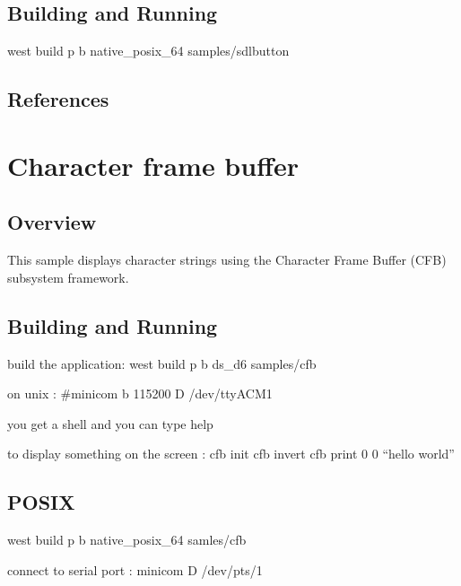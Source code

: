\documentclass[letterpaper,10pt,english]{sphinxmanual}
\begin{document}
\subsection{Building and Running}
\label{\detokenize{samples/samplesbuttonsdlbuttonREADME:building-and-running}}
west build \sphinxhyphen{}p \sphinxhyphen{}b native\_posix\_64 samples/sdlbutton


\subsection{References}
\label{\detokenize{samples/samplesbuttonsdlbuttonREADME:references}}

\section{Character frame buffer}
\label{\detokenize{samples/samplescfbREADME:character-frame-buffer}}\label{\detokenize{samples/samplescfbREADME:character-frame-buffer-sample}}\label{\detokenize{samples/samplescfbREADME::doc}}

\subsection{Overview}
\label{\detokenize{samples/samplescfbREADME:overview}}
This sample displays character strings using the Character Frame Buffer
(CFB) subsystem framework.


\subsection{Building and Running}
\label{\detokenize{samples/samplescfbREADME:building-and-running}}
build the application: west build \sphinxhyphen{}p \sphinxhyphen{}b ds\_d6 samples/cfb

on unix : \#minicom \sphinxhyphen{}b 115200 \sphinxhyphen{}D /dev/ttyACM1

you get a shell and you can type help

to display something on the screen :
cfb init
cfb invert
cfb print 0 0 “hello world”


\subsection{POSIX}
\label{\detokenize{samples/samplescfbREADME:posix}}
west build \sphinxhyphen{}p \sphinxhyphen{}b native\_posix\_64 samles/cfb

connect to serial port :
minicom \sphinxhyphen{}D /dev/pts/1
\end{document}
